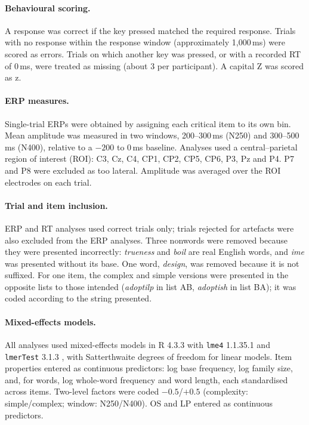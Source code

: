 \paragraph{Behavioural scoring.}
A response was correct if the key pressed matched the required response.
Trials with no response within the response window (approximately 1,000\,ms)
were scored as errors. %
Trials on which another key was pressed, or with a recorded RT of 0\,ms, were
treated as missing (about 3 per participant). A capital Z was scored as z.

\paragraph{ERP measures.}
Single-trial ERPs were obtained by assigning each critical item to its own bin.
Mean amplitude was measured in two windows, 200--300\,ms (N250) and
300--500\,ms (N400), relative to a $-200$ to 0\,ms baseline. Analyses used a
central--parietal region of interest (ROI): C3, Cz, C4, CP1, CP2, CP5, CP6, P3,
Pz and P4. P7 and P8 were excluded as too lateral. Amplitude was averaged over
the ROI electrodes on each trial.

\paragraph{Trial and item inclusion.}
ERP and RT analyses used correct trials only; trials rejected for artefacts were
also excluded from the ERP analyses. Three nonwords were removed because they
were presented incorrectly: \textit{trueness} and \textit{boil} are real English
words, and \textit{ime} was presented without its base. One word,
\textit{design}, was removed because it is not suffixed. For one item, the
complex and simple versions were presented in the opposite lists to those
intended (\textit{adoptilp} in list AB, \textit{adoptish} in list BA); it was
coded according to the string presented.

\paragraph{Mixed-effects models.}
All analyses used mixed-effects models in R 4.3.3 with \texttt{lme4} 1.1.35.1
\citep{batesFittingLinearMixedeffects2015} %
and \texttt{lmerTest} 3.1.3 \citep{kuznetsovaLmerTestPackageTests2017}, with
Satterthwaite degrees of freedom for linear models. Item properties entered as
continuous predictors: log base frequency, log family size, and, for words, log
whole-word frequency and word length, each standardised across items. Two-level
factors were coded $-0.5$/$+0.5$ (complexity: simple/complex; window: N250/N400).
OS and LP entered as continuous predictors.

